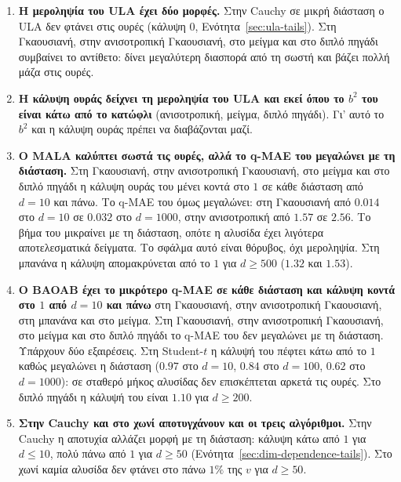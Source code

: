\begin{enumerate}
  \item \textbf{Η μεροληψία του ULA έχει δύο μορφές.} Στην Cauchy σε μικρή
        διάσταση ο ULA δεν φτάνει στις ουρές (κάλυψη $0$,
        Ενότητα~\ref{sec:ula-tails}). Στη Γκαουσιανή, στην ανισοτροπική Γκαουσιανή,
        στο μείγμα και στο διπλό πηγάδι συμβαίνει το αντίθετο: δίνει μεγαλύτερη
        διασπορά από τη σωστή και βάζει πολλή μάζα στις ουρές.
  \item \textbf{Η κάλυψη ουράς δείχνει τη μεροληψία του ULA και εκεί όπου το $b^2$
        του είναι κάτω από το κατώφλι} (ανισοτροπική, μείγμα, διπλό πηγάδι). Γι' αυτό
        το $b^2$ και η κάλυψη ουράς πρέπει να διαβάζονται μαζί.
  \item \textbf{Ο MALA καλύπτει σωστά τις ουρές, αλλά το q-MAE του μεγαλώνει με τη
        διάσταση.} Στη Γκαουσιανή, στην ανισοτροπική Γκαουσιανή, στο μείγμα και στο
        διπλό πηγάδι η κάλυψη ουράς του μένει κοντά στο $1$ σε κάθε διάσταση από
        $d=10$ και πάνω. Το q-MAE του όμως μεγαλώνει: στη Γκαουσιανή από $0.014$ στο
        $d=10$ σε $0.032$ στο $d=1000$, στην ανισοτροπική από $1.57$ σε $2.56$. Το βήμα
        του μικραίνει με τη διάσταση, οπότε η αλυσίδα έχει λιγότερα αποτελεσματικά
        δείγματα. Το σφάλμα αυτό είναι θόρυβος, όχι μεροληψία. Στη μπανάνα η κάλυψη
        απομακρύνεται από το $1$ για $d \ge 500$ ($1.32$ και $1.53$).
  \item \textbf{Ο BAOAB έχει το μικρότερο q-MAE σε κάθε διάσταση και κάλυψη κοντά
        στο $1$ από $d=10$ και πάνω} στη Γκαουσιανή, στην ανισοτροπική Γκαουσιανή, στη
        μπανάνα και στο μείγμα. Στη Γκαουσιανή, στην ανισοτροπική Γκαουσιανή, στο μείγμα και στο διπλό
        πηγάδι το q-MAE του δεν μεγαλώνει με τη διάσταση. Υπάρχουν δύο εξαιρέσεις. Στη
        Student-$t$ η κάλυψή του πέφτει κάτω από το $1$ καθώς μεγαλώνει η διάσταση
        ($0.97$ στο $d=10$, $0.84$ στο $d=100$, $0.62$ στο $d=1000$): σε σταθερό μήκος
        αλυσίδας δεν επισκέπτεται αρκετά τις ουρές. Στο διπλό πηγάδι η κάλυψή του
        είναι $1.10$ για $d \ge 200$.
  \item \textbf{Στην Cauchy και στο χωνί αποτυγχάνουν και οι τρεις αλγόριθμοι.} Στην
        Cauchy η αποτυχία αλλάζει μορφή με τη διάσταση: κάλυψη κάτω από $1$ για
        $d \le 10$, πολύ πάνω από $1$ για $d \ge 50$
        (Ενότητα~\ref{sec:dim-dependence-tails}). Στο χωνί καμία αλυσίδα δεν φτάνει
        στο πάνω $1\%$ της $v$ για $d \ge 50$.
\end{enumerate}

